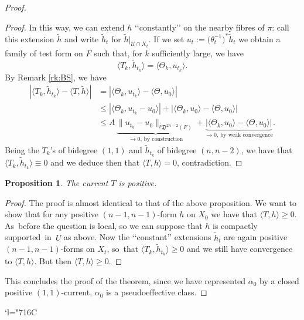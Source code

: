 \documentclass[JEP,XML,SOM,Unicode,NoEqCountersInSection,published]{cedram}
\let\mathcal\mathscr
\newcommand{\Changelback}{\mathcode`l="716C}
\theoremstyle{plain}
\newtheorem{proposition}[theorem]{Proposition}
\theoremstyle{definition}
\begin{document}
\begin{appendix}
\begin{proof}
\begin{proof}
In this way, we can extend $h$ \lq\lq constantly\rq\rq{} on the nearby fibres of $\pi$: call this extension $\tilde h$ and write $\tilde h_t$ for $\tilde h|_{\mathcal U\cap X_t}$. If we set $u_t:=\bigl(\theta_t^{-1}\bigr)^*\tilde h_t$ we obtain a family of test form on $F$ such that, for $k$ sufficiently large, we have
\[
\langle T_k,\tilde h_{t_k}\rangle=\langle\Theta_k,u_{t_k}\rangle.
\]
By Remark \ref{rk:BS}, we have
\[
\begin{aligned}
|\langle T_k,\tilde h_{t_k}\rangle-\langle T,\tilde h\rangle| &= |\langle\Theta_k,u_{t_k}\rangle-\langle\Theta,u_{0}\rangle| \\
&\le |\langle\Theta_k,u_{t_k}-u_0\rangle|+|\langle\Theta_k,u_0\rangle-\langle\Theta,u_0\rangle|\\
&\le A\,\underbrace{\|u_{t_k}-u_0\|_{^p\mathfrak D^{2n-2}(F)}}_{\textrm{$\to 0$, by construction}}+\underbrace{|\langle\Theta_k,u_0\rangle-\langle\Theta,u_0\rangle|}_{\textrm{$\to 0$, by weak convergence}}.
\end{aligned}
\]
Being the $T_k$'s of bidegree $(1,1)$ and $\tilde h_{t_k}$ of bidegree $(n,n-2)$, we have that \hbox{$\langle T_k,\tilde h_{t_k}\rangle\equiv 0$} and we deduce then that $\langle T,h\rangle=0$, contradiction.
\end{proof}

\begin{proposition}
The current $T$ is positive.
\end{proposition}

\begin{proof}
The proof is almost identical to that of the above proposition. We want to show that for any positive $(n-1,n-1)$-form $h$ on $X_0$ we have that $\langle T,h\rangle\ge 0$. As~before the question is local, so we can suppose that $h$ is compactly supported~in~$U$ as above. Now the \lq\lq constant\rq\rq{} extensions $\tilde h_t$ are again positive $(n-1,n-1)$-forms on $X_t$, so~that $\langle T_k,\tilde h_{t_k}\rangle\ge 0$ and we still have convergence to $\langle T,h\rangle$. But then $\langle T,h\rangle\ge 0$.
\end{proof}

This concludes the proof of the theorem, since we have represented $\alpha_0$ by a closed positive $(1,1)$-current, \ie $\alpha_0$ is a pseudoeffective class.
\end{proof}

\end{appendix}

\Changelback
\backmatter


\end{document}

